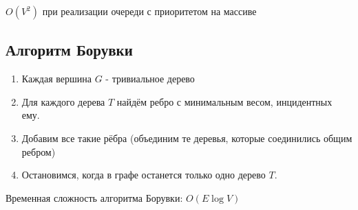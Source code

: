$O(V^2)$  при реализации очереди с приоритетом на массиве

\subsection{Алгоритм Борувки}

\begin{enumerate}
	\item Каждая вершина $G$ - тривиальное дерево
	\item Для каждого дерева $T$ найдём ребро с минимальным весом, инцидентных ему.
	\item Добавим все такие рёбра (объединим те деревья, которые соединились общим ребром)
	\item Остановимся, когда в графе останется только одно дерево $T$.
\end{enumerate}
Временная сложность алгоритма Борувки: $O(E\log{V})$